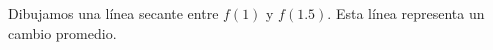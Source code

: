 \documentclass[preview]{standalone}
\begin{document}
\begin{center}
Dibujamos una línea secante entre $f(1)$ y $f(1.5)$. Esta línea representa un cambio promedio.
\end{center}
\end{document}
